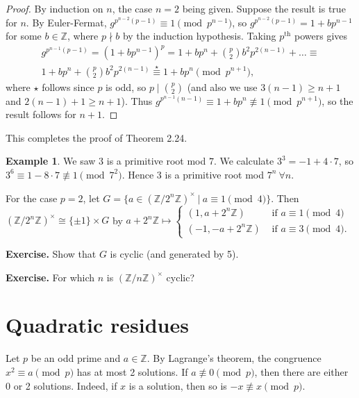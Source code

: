 \documentclass{article}
\theoremstyle{definition}
\newtheorem{example}{Example}[section]
\begin{document}
\begin{proof}
    By induction on $n$, the case $n=2$ being given. Suppose the result is true for $n$. By Euler-Fermat, $g^{p^{n-2}(p-1)} \equiv 1 \pmod{p^{n-1}}$, so $g^{p^{n-2}(p-1)} = 1 +b p^{n-1}$ for some $b \in \mathbb{Z}$, where $p \nmid b$ by the induction hypothesis. Taking $p^{\text{th}}$ powers gives 
    \begin{align*}
        g^{p^{n-1}(p-1)} = (1+bp^{n-1})^p = 1 + bp^n + {{p} \choose {2}}b^2p^{2(n-1)}+\ldots \equiv \\ 1 + bp^n + {{p} \choose {2}}b^2 p^{2(n-1)} \stackrel{\star}{\equiv } 1 + bp^n \pmod{p^{n+1}},
    \end{align*}
    where $\star$ follows since $p$ is odd, so $p \mid {{p}\choose{2}}$ (and also we use $3(n-1)\ge n+1$ and $2(n-1)+1\ge n+1$). Thus $g^{p^{n-1}(n-1)} \equiv 1 +bp^n \not\equiv 1 \pmod{p^{n+1}}$, so the result follows for $n+1$.
\end{proof}
This completes the proof of Theorem 2.24.

\begin{example}
    We saw $3$ is a primitive root mod $7$. We calculate $3^3 = -1 + 4\cdot 7$, so $3^6 \equiv 1 - 8\cdot 7 \not\equiv 1 \pmod{7^2}$. Hence $3$ is a primitive root mod $7^n ~\forall n$.
\end{example}

For the case $p=2$, let $G = \{a \in (\mathbb{Z}/2^n\mathbb{Z})^{\times} ~|~ a \equiv 1 \pmod{4}\}$. Then $(\mathbb{Z}/2^n\mathbb{Z})^{\times} \cong \{\pm 1\} \times G$ by $a+2^n\mathbb{Z} \mapsto \begin{cases}
    (1, a+2^n\mathbb{Z}) &\text{ if }a \equiv 1\pmod{4}\\
    (-1, -a+2^n\mathbb{Z}) &\text{ if }a \equiv 3\pmod{4}.
\end{cases}$

\textbf{Exercise.} Show that $G$ is cyclic (and generated by 5).

\textbf{Exercise.} For which $n$ is $(\mathbb{Z}/n\mathbb{Z})^{\times}$ cyclic? 


\section{Quadratic residues}

Let $p$ be an odd prime and $a \in \mathbb{Z}$. By Lagrange's theorem, the congruence $x^2 \equiv a \pmod{p}$ has at most 2 solutions. If $a \not\equiv 0\pmod{p}$, then there are either 0 or 2 solutions. Indeed, if $x$ is a solution, then so is $-x \not\equiv x \pmod{p}$.
\end{document}
